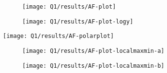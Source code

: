 \documentclass[12pt,onecolumn,a4paper]{article}
\begin{document}
\begin{figure}[h]
\begin{subfigure}{\linewidth}
\begin{adjustbox}{scale=1.2}
			\end{adjustbox}
			\caption{}
		\end{subfigure}
		\caption{}
	\end{figure}
	
	
	\begin{figure}[h]
		\begin{subfigure}{.48\linewidth}
			\centering
			\texttt{[image: Q1/results/AF-plot]}
			\caption{}
			\label{fig:af-plot}
		\end{subfigure}
		\hfill
		\begin{subfigure}{.48\linewidth}
			\centering
			\texttt{[image: Q1/results/AF-plot-logy]}
			\caption{}
			\label{fig:af-plot-logy}
		\end{subfigure}
		\caption{
			\space
		}
	\end{figure}
	
	
	\begin{figure}
		\centering
		\texttt{[image: Q1/results/AF-polarplot]}
		\caption{}
		\label{fig:af-polarplot}
	\end{figure}
	
	
	
	\begin{figure}
		\centering
		\begin{subfigure}{\linewidth}
			\centering
			\texttt{[image: Q1/results/AF-plot-localmaxmin-a]}
			\caption{}
			\label{fig:af-plot-localmaxmin-a}
		\end{subfigure}
		
		\begin{subfigure}{\linewidth}
			\centering
			\texttt{[image: Q1/results/AF-plot-localmaxmin-b]}
			\caption{}
			\label{fig:af-plot-localmaxmin-b}
		\end{subfigure}
		
		\caption{
			\space
		}
	\end{figure}
	
\end{document}
